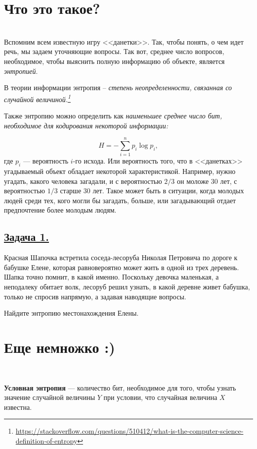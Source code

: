 \section*{Что это такое?}~\
\\ 

Вспомним всем известную игру <<данетки>>. Так, чтобы понять, о чем идет речь, мы задаем уточняющие вопросы. Так вот, среднее число вопросов, необходимое, чтобы выяснить полную информацию об объекте, является \textit{энтропией}.

В теории информации энтропия -- \textit{степень неопределенности, связанная со случайной величиной.\footnote{\url{https://stackoverflow.com/questions/510412/what-is-the-computer-science-definition-of-entropy}}}

Также энтропию можно определить как \textit{наименьшее среднее число бит, необходимое для кодирования некоторой информации:}

\[H=-\sum\limits_{i=1}^n p_i\log p_i, \]
где $p_i$ --- вероятность $i$-го исхода. Или вероятность того, что в <<данетках>> угадываемый объект обладает некоторой характеристикой. Например, нужно угадать, какого человека загадали, и с вероятностью $2/3$ он моложе 30 лет, с вероятностью $1/3$ старше 30 лет. Такое может быть в ситуации, когда молодых людей среди тех, кого могли бы загадать, больше, или загадывающий отдает предпочтение более молодым людям. 

\subsection*{\hyperref[sec:sol_problem1]{Задача 1.}}\label{sec:problem1} 
Красная Шапочка встретила соседа-лесоруба Николая Петровича по дороге к бабушке Елене, которая равновероятно может жить в одной из трех деревень. Шапка точно помнит, в какой именно. Поскольку девочка маленькая, а неподалеку обитает волк, лесоруб решил узнать, в какой деревне живет бабушка, только не спросив напрямую, а задавая наводящие вопросы. 

Найдите энтропию местонахождения Елены.

\section*{Еще немножко :)}~\
\\

\begin{siderules}
    \textbf{Условная энтропия} --- количество бит, необходимое для того, чтобы узнать значение случайной величины $Y$ при условии, что случайная величина $X$ известна.
\end{siderules}


